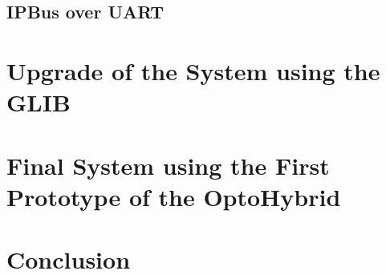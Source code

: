     \subsection{IPBus over UART}



  \section{Upgrade of the System using the GLIB}

  \section{Final System using the First Prototype of the OptoHybrid}

























  \section{Conclusion}

